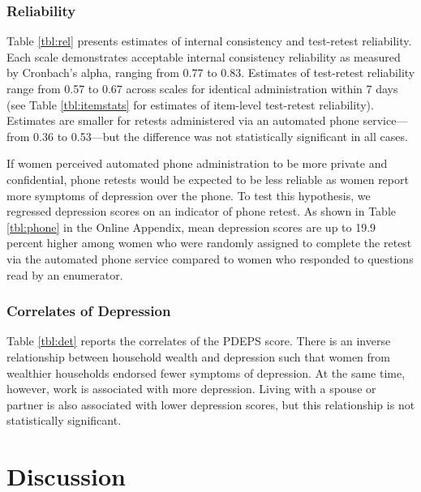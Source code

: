 \documentclass[man,natbib,longtable]{apa6}\usepackage[]{graphicx}\usepackage[]{color}
\begin{document}


\subsubsection{Reliability}

Table \ref{tbl:rel} presents estimates of internal consistency and test-retest reliability. Each scale demonstrates acceptable internal consistency reliability as measured by Cronbach's alpha, ranging from 0.77 to 0.83. Estimates of test-retest reliability range from 0.57 to 0.67 across scales for identical administration within 7 days (see Table \ref{tbl:itemstats} for estimates of item-level test-retest reliability). Estimates are smaller for retests administered via an automated phone service---from 0.36 to 0.53---but the difference was not statistically significant in all cases.

If women perceived automated phone administration to be more private and confidential, phone retests would be expected to be less reliable as women report more symptoms of depression over the phone. To test this hypothesis, we regressed depression scores on an indicator of phone retest. As shown in Table \ref{tbl:phone} in the Online Appendix, mean depression scores are up to 19.9 percent higher among women who were randomly assigned to complete the retest via the automated phone service compared to women who responded to questions read by an enumerator.



\subsubsection{Correlates of Depression}

Table \ref{tbl:det} reports the correlates of the PDEPS score. There is an inverse relationship between household wealth and depression such that women from wealthier households endorsed fewer symptoms of depression. At the same time, however, work is associated with more depression. Living with a spouse or partner is also associated with lower depression scores, but this relationship is not statistically significant.  



\section{Discussion}
\end{document}
